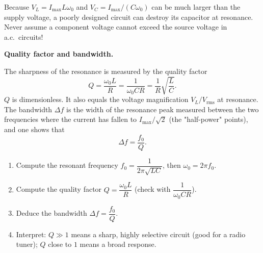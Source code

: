 \documentclass[11pt]{article}
\newcommand{\cle}[1]{{\popxbold\color{popdark}#1}}
\begin{document}
\begin{attention}
Because $V_L = I_{\max}L\omega_0$ and $V_C = I_{\max}/(C\omega_0)$ can be much larger than the supply voltage, a poorly designed circuit can destroy its capacitor at resonance. Never assume a component voltage cannot exceed the source voltage in a.c.\ circuits!
\end{attention}

\textbf{Quality factor and bandwidth.}\par
The sharpness of the resonance is measured by the \cle{quality factor}
\[
Q = \frac{\omega_0 L}{R} = \frac{1}{\omega_0 C R} = \frac{1}{R}\sqrt{\frac{L}{C}} .
\]
$Q$ is dimensionless. It also equals the voltage magnification $V_L/V_{\mathrm{rms}}$ at resonance. The \cle{bandwidth} $\Delta f$ is the width of the resonance peak measured between the two frequencies where the current has fallen to $I_{\max}/\sqrt{2}$ (the "half-power" points), and one shows that
\[
\Delta f = \frac{f_0}{Q} .
\]

\begin{methode}
\begin{enumerate}
\item Compute the resonant frequency $f_0 = \dfrac{1}{2\pi\sqrt{LC}}$, then $\omega_0 = 2\pi f_0$.
\item Compute the quality factor $Q = \dfrac{\omega_0 L}{R}$ (check with $\dfrac{1}{\omega_0 C R}$).
\item Deduce the bandwidth $\Delta f = \dfrac{f_0}{Q}$.
\item Interpret: $Q \gg 1$ means a sharp, highly selective circuit (good for a radio tuner); $Q$ close to $1$ means a broad response.
\end{enumerate}
\end{methode}
\end{document}
